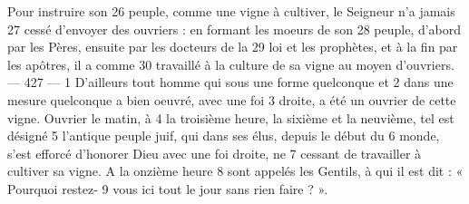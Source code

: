 Pour instruire son	 
26	 	peuple, comme une vigne à cultiver, le Seigneur n'a jamais	 
27	 	cessé d'envoyer des ouvriers : en formant les moeurs de son	 
28	 	peuple, d'abord par les Pères, ensuite par les docteurs de la	 
29	 	loi et les prophètes, et à la fin par les apôtres, il a comme	 
30	 	travaillé à la culture de sa vigne au moyen d'ouvriers.	 
 	--- 427 ---	 
1	 	D'ailleurs tout homme qui sous une forme quelconque et	 
2	 	dans une mesure quelconque a bien oeuvré, avec une foi	 
3	 	droite, a été un ouvrier de cette vigne. Ouvrier le matin, à	 
4	 	la troisième heure, la sixième et la neuvième, tel est désigné	 
5	 	l'antique peuple juif, qui dans ses élus, depuis le début du	 
6	 	monde, s'est efforcé d'honorer Dieu avec une foi droite, ne	 
7	 	cessant de travailler à cultiver sa vigne. A la onzième heure	 
8	 	sont appelés les Gentils, à qui il est dit : « Pourquoi restez-	 
9	 	vous ici tout le jour sans rien faire ? ».